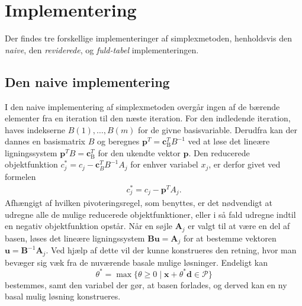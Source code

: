 %
\section{Implementering}
\label{julieergudesmuk}
Der findes tre forskellige implementeringer af simplexmetoden, henholdsvis den \textit{naive}, den \textit{reviderede}, og \textit{fuld-tabel} implementeringen.
%
\subsection{Den naive implementering}
I den naive implementering af simplexmetoden overgår ingen af de bærende elementer fra en iteration til den næste iteration. 
For den indledende iteration, haves indekserne
$B(1),\ldots,B(m)$ for de givne basisvariable. 
Derudfra kan der dannes en basismatrix $B$ og beregnes $\mathbf{p}^T=\mathbf{c}_{\text{B}}^T B^{-1}$ ved at løse det lineære ligningssystem $\mathbf{p}^T B=\mathbf{c}_{\text{B}}^T$ for den ukendte vektor $\mathbf{p}$.
Den reducerede objektfunktion $c_j^* = c_j - \mathbf{c}_B^T B^{-1}A_j$ for enhver variabel $x_j$, er derfor givet ved formelen
%
\begin{align*}
c_j^* = c_j - \mathbf{p}^T A_j.
\end{align*}
%
Afhængigt af hvilken pivoteringsregel, som benyttes, er det nødvendigt at udregne alle de mulige reducerede objektfunktioner, eller i så fald udregne indtil en negativ objektfunktion opstår.
Når en søjle $\mathbf{A}_j$ er valgt til at være en del af basen, løses det lineære ligningssystem $\mathbf{Bu}=\mathbf{A}_j$ for at bestemme vektoren $\mathbf{u}=\mathbf{B}^{-1}\mathbf{A}_j$.
Ved hjælp af dette vil der kunne konstrueres den retning, hvor man bevæger sig væk fra de nuværende basale mulige løsninger.
Endeligt kan $$\theta^* = \max \{ \theta \geq 0 \mid \textbf{x} + \theta^*\textbf{d} \in \mathcal{P} \}$$ bestemmes, samt den variabel der gør, at basen forlades, og derved kan en ny basal mulig løsning konstrueres. \\\\
%
